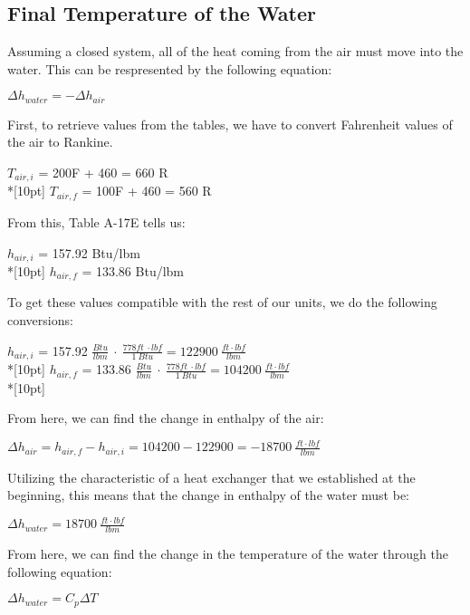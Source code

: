 \documentclass{article}
\begin{document}
\subsection{Final Temperature of the Water}
Assuming a closed system, all of the heat coming from the air must move into the water. This can be respresented by the following equation:
\begin{center}
    \(\Delta h_{water} = -\Delta h_{air}\)
\end{center}
First, to retrieve values from the tables, we have to convert Fahrenheit values of the air to Rankine.
\begin{center}
    \(T_{air, i}\) = 200\textdegree F + 460 = 660 R\\*[10pt]
    \(T_{air, f}\) = 100\textdegree F + 460 = 560 R
\end{center}
From this, Table A-17E tells us: 
\begin{center}
    \(h_{air, i}\) = 157.92 Btu/lbm\\*[10pt]
    \(h_{air, f}\) = 133.86 Btu/lbm
\end{center}
To get these values compatible with the rest of our units, we do the following conversions:
\begin{center}
    \(h_{air, i}\) = 157.92 \(\displaystyle \frac{Btu}{lbm}\ \cdot\: \frac{778 ft\:\cdot lbf}{1 \:Btu} = 122900\:\)\(\displaystyle\frac{ft\cdot lbf}{lbm}\)\\*[10pt]
    \(h_{air, f}\) = 133.86 \(\displaystyle \frac{Btu}{lbm}\ \cdot\: \frac{778 ft\:\cdot lbf}{1\: Btu} = 104200\:\)\(\displaystyle\frac{ft\cdot lbf}{lbm}\)\\*[10pt]
\end{center}
From here, we can find the change in enthalpy of the air:
\begin{center}
    \(\Delta h_{air} = h_{air, f} - h_{air, i} = 104200 - 122900 = -18700\:\)\(\displaystyle\frac{ft\cdot lbf}{lbm}\)
\end{center}
\clearpage \noindent
Utilizing the characteristic of a heat exchanger that we established at the beginning, this means that the change in enthalpy of the water must be:
\begin{center}
    \(\Delta h_{water} = 18700\:\)\(\displaystyle\frac{ft\cdot lbf}{lbm}\)
\end{center}
From here, we can find the change in the temperature of the water through the following equation:
\begin{center}
    \(\Delta h_{water} = C_p\Delta T\)
\end{center}
\end{document}
